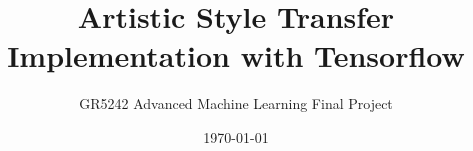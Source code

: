 \documentclass[letterpaper,11pt, oneside]{layout}
\title{Artistic Style Transfer Implementation with Tensorflow}
\subtitle{GR5242 Advanced Machine Learning Final Project}
\date{\today}
\begin{document}
\cleardoublepage
\maketitle

\frontmatter
\begin{spacing}{1}
%

\tableofcontents
\listoffigures
\listoftables
\end{spacing}


\mainmatter








\appendix
\renewcommand\theequation{\Alph{chapter}--\arabic{equation}}
\renewcommand\thefigure{\Alph{chapter}--\arabic{figure}}
\renewcommand\thetable{\Alph{chapter}--\arabic{table}}





\backmatter



\end{document}
